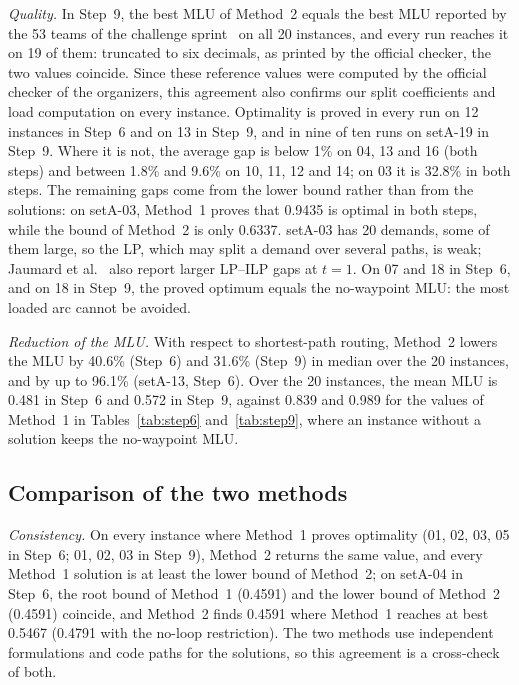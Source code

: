\documentclass[conference]{IEEEtran}
\begin{document}
\emph{Quality.} In Step~9, the best MLU of Method~2 equals the best MLU reported by the 53 teams of the challenge sprint~\cite{roadefrepo} on all 20 instances, and every run reaches it on 19 of them: truncated to six decimals, as printed by the official checker, the two values coincide. Since these reference values were computed by the official checker of the organizers, this agreement also confirms our split coefficients and load computation on every instance. Optimality is proved in every run on 12 instances in Step~6 and on 13 in Step~9, and in nine of ten runs on setA-19 in Step~9. Where it is not, the average gap is below 1\% on 04, 13 and 16 (both steps) and between 1.8\% and 9.6\% on 10, 11, 12 and 14; on 03 it is 32.8\% in both steps. The remaining gaps come from the lower bound rather than from the solutions: on setA-03, Method~1 proves that 0.9435 is optimal in both steps, while the bound of Method~2 is only 0.6337. setA-03 has 20 demands, some of them large, so the LP, which may split a demand over several paths, is weak; Jaumard et al.~\cite{jaumard2026} also report larger LP--ILP gaps at $t=1$. On 07 and 18 in Step~6, and on 18 in Step~9, the proved optimum equals the no-waypoint MLU: the most loaded arc cannot be avoided.

\emph{Reduction of the MLU.} With respect to shortest-path routing, Method~2 lowers the MLU by 40.6\% (Step~6) and 31.6\% (Step~9) in median over the 20 instances, and by up to 96.1\% (setA-13, Step~6). Over the 20 instances, the mean MLU is 0.481 in Step~6 and 0.572 in Step~9, against 0.839 and 0.989 for the values of Method~1 in Tables~\ref{tab:step6} and~\ref{tab:step9}, where an instance without a solution keeps the no-waypoint MLU.

\subsection{Comparison of the two methods}\label{sec:compare}
\emph{Consistency.} On every instance where Method~1 proves optimality (01, 02, 03, 05 in Step~6; 01, 02, 03 in Step~9), Method~2 returns the same value, and every Method~1 solution is at least the lower bound of Method~2; on setA-04 in Step~6, the root bound of Method~1 (0.4591) and the lower bound of Method~2 (0.4591) coincide, and Method~2 finds 0.4591 where Method~1 reaches at best 0.5467 (0.4791 with the no-loop restriction). The two methods use independent formulations and code paths for the solutions, so this agreement is a cross-check of both.
\end{document}
